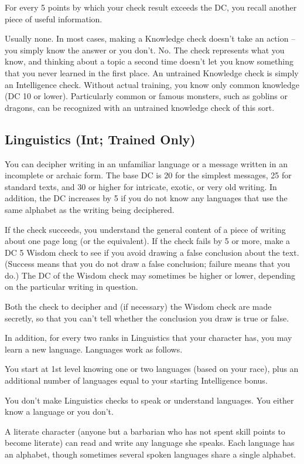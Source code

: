 For every 5 points by which your check result exceeds the DC, you recall another piece of useful information.

 Usually none. In most cases, making a Knowledge check doesn't take an action -- you simply know the answer or you don't.
 No. The check represents what you know, and thinking about a topic a second time doesn't let you know something that you never learned in the first place.
 An untrained Knowledge check is simply an Intelligence check. Without actual training, you know only common knowledge (DC 10 or lower). Particularly common or famous monsters, such as goblins or dragons, can be recognized with an untrained knowledge check of this sort.

\subsection{Linguistics (Int; Trained Only)}
 You can decipher writing in an unfamiliar language or a message written in an incomplete or archaic form. The base DC is 20 for the simplest messages, 25 for standard texts, and 30 or higher for intricate, exotic, or very old writing. In addition, the DC increases by 5 if you do not know any languages that use the same alphabet as the writing being deciphered.

If the check succeeds, you understand the general content of a piece of writing about one page long (or the equivalent). If the check fails by 5 or more, make a DC 5 Wisdom check to see if you avoid drawing a false conclusion about the text. (Success means that you do not draw a false conclusion; failure means that you do.) The DC of the Wisdom check may sometimes be higher or lower, depending on the particular writing in question.

Both the check to decipher and (if necessary) the Wisdom check are made secretly, so that you can't tell whether the conclusion you draw is true or false.

In addition, for every two ranks in Linguistics that your character has, you may learn a new language. Languages work as follows.
\begin{itemize*}
\item You start at 1st level knowing one or two languages (based on your race), plus an additional number of languages equal to your starting Intelligence bonus.
\item You don't make Linguistics checks to speak or understand languages. You either know a language or you don't.
\item A literate character (anyone but a barbarian who has not spent skill points to become literate) can read and write any language she speaks. Each language has an alphabet, though sometimes several spoken languages share a single alphabet.
\end{itemize*}

